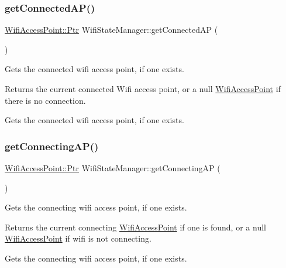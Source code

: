 \subsubsection{\texorpdfstring{get\+Connected\+A\+P()}{getConnectedAP()}}
{\footnotesize\ttfamily \mbox{\hyperlink{classWifiAccessPoint_ad18977f884076774803027efbaa131a0}{Wifi\+Access\+Point\+::\+Ptr}} Wifi\+State\+Manager\+::get\+Connected\+AP (\begin{DoxyParamCaption}{ }\end{DoxyParamCaption})}

Gets the connected wifi access point, if one exists.

\begin{DoxyReturn}{Returns}
the current connected Wifi access point, or a null \mbox{\hyperlink{classWifiAccessPoint}{Wifi\+Access\+Point}} if there is no connection.
\end{DoxyReturn}
Gets the connected wifi access point, if one exists. \mbox{\label{classWifiStateManager_afb6ba1a34390127a1d4b395f06f1cef4}} 
\subsubsection{\texorpdfstring{get\+Connecting\+A\+P()}{getConnectingAP()}}
{\footnotesize\ttfamily \mbox{\hyperlink{classWifiAccessPoint_ad18977f884076774803027efbaa131a0}{Wifi\+Access\+Point\+::\+Ptr}} Wifi\+State\+Manager\+::get\+Connecting\+AP (\begin{DoxyParamCaption}{ }\end{DoxyParamCaption})}

Gets the connecting wifi access point, if one exists.

\begin{DoxyReturn}{Returns}
the current connecting \mbox{\hyperlink{classWifiAccessPoint}{Wifi\+Access\+Point}} if one is found, or a null \mbox{\hyperlink{classWifiAccessPoint}{Wifi\+Access\+Point}} if wifi is not connecting.
\end{DoxyReturn}
Gets the connecting wifi access point, if one exists. \mbox{\label{classWifiStateManager_a8347f0efd28a3e53cf645e28fa2be10b}} 
